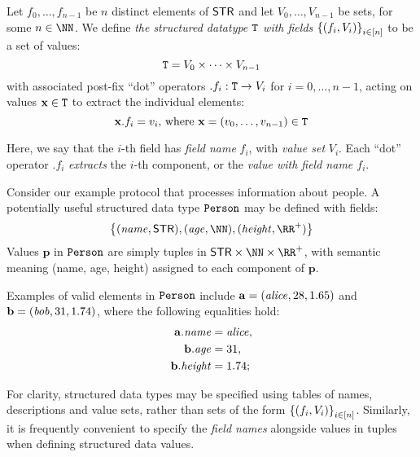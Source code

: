 \begin{definition}\label{preliminaries:def:datatype}
  Let $f_0, \ldots, f_{n-1}$ be $n$ distinct elements of $\mathsf{STR}$ and let $V_0, \ldots, V_{n-1}$ be sets, for some $n \in \NN$. We define \emph{the structured datatype ${\mathtt{T}}$ with fields $\left\{{(f_i, V_i)}\right\}_{i \in [n]}$} to be a set of values:
  \[
    {\mathtt{T}} = V_0 \times \cdots \times V_{n-1}
  \]
  with associated post-fix ``dot'' operators $.f_i : {\mathtt{T}} \to V_i$ for $i = 0, \ldots, n-1$, acting on values $\mathbf{x} \in {\mathtt{T}}$ to extract the individual elements:
  \[
    \mathbf{x}.f_i = v_i \text{, where } \mathbf{x} = (v_0, \ldots, v_{n-1}) \in {\mathtt{T}}
  \]

  Here, we say that the $i$-th field has \emph{field name} $f_i$, with \emph{value set} $V_i$. Each ``dot'' operator $.f_i$ \emph{extracts} the $i$-th component, or the \emph{value with field name $f_i$}.
\end{definition}

\begin{example}\label{preliminaries:eg:datatype-person}
  Consider our example protocol that processes information about people. A potentially useful structured data type ${\mathtt{Person}}$ may be defined with fields:
  \[
    \smallset{ (\varstyle{name}, \STR), (\varstyle{age}, \NN), (\varstyle{height}, \RR^+) }
  \]
  Values $\mathbf{p}$ in ${\mathtt{Person}}$ are simply tuples in $\STR{} \times \NN \times \RR^+$, with semantic meaning (name, age, height) assigned to each component of $\mathbf{p}$.

  Examples of valid elements in ${\mathtt{Person}}$ include $\mathbf{a} = (\mathit{alice}, 28, 1.65)$ and $\mathbf{b} = (\mathit{bob}, 31, 1.74)$, where the following equalities hold:
  \begin{align*}
    \mathbf{a}.\mathit{name} &= \mathit{alice}, \\
    \mathbf{b}.\mathit{age} &= 31, \\
    \mathbf{b}.\mathit{height} &= 1.74;
  \end{align*}
\end{example}

For clarity, structured data types may be specified using tables of names, descriptions and value sets, rather than sets of the form $\left\{{(f_i, V_i)}\right\}_{i \in [n]}$. Similarly, it is frequently convenient to specify the \emph{field names} alongside values in tuples when defining structured data values.


